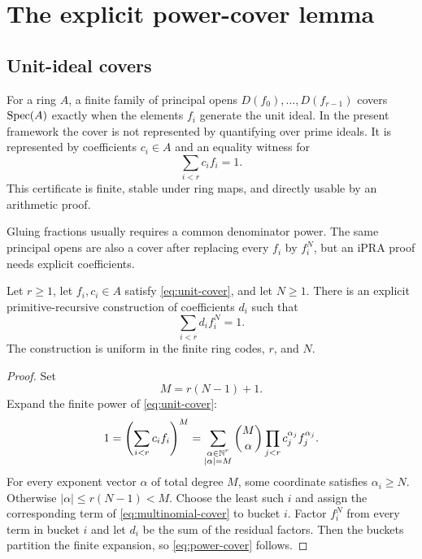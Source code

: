 \section{The explicit power-cover lemma}

\subsection{Unit-ideal covers}

For a ring $A$, a finite family of principal opens $D(f_0),\ldots,D(f_{r-1})$ covers
$\operatorname{Spec}(A)$ exactly when the elements $f_i$ generate the unit ideal.  In the present framework the
cover is not represented by quantifying over prime ideals.  It is represented by coefficients
$c_i\in A$ and an equality witness for
\begin{equation}\label{eq:unit-cover}
                 \sum_{i<r} c_i f_i=1.
\end{equation}
This certificate is finite, stable under ring maps, and directly usable by an arithmetic proof.

Gluing fractions usually requires a common denominator power.  The same principal opens are also a
cover after replacing every $f_i$ by $f_i^N$, but an iPRA proof needs explicit coefficients.

\begin{theorem}\label{thm:power-cover}
Let $r\geq1$, let $f_i,c_i\in A$ satisfy \eqref{eq:unit-cover}, and let $N\geq1$.  There is an
explicit primitive-recursive construction of coefficients $d_i$ such that
\begin{equation}\label{eq:power-cover}
                  \sum_{i<r}d_i f_i^N=1.
\end{equation}
The construction is uniform in the finite ring codes, $r$, and $N$.
\end{theorem}

\begin{proof}
Set
\[
                    M=r(N-1)+1.
\]
Expand the finite power of \eqref{eq:unit-cover}:
\begin{equation}\label{eq:multinomial-cover}
  1=\left(\sum_{i<r}c_i f_i\right)^M
   =\sum_{\substack{\alpha\in\mathbb N^r\\ |\alpha|=M}}
      \binom{M}{\alpha}\prod_{j<r}c_j^{\alpha_j}f_j^{\alpha_j}.
\end{equation}
For every exponent vector $\alpha$ of total degree $M$, some coordinate satisfies
$\alpha_i\geq N$.  Otherwise
$|\alpha|\leq r(N-1)<M$.  Choose the least such $i$ and assign the corresponding term of
\eqref{eq:multinomial-cover} to bucket $i$.  Factor $f_i^N$ from every term in bucket $i$ and let
$d_i$ be the sum of the residual factors.  Then the buckets partition the finite expansion, so
\eqref{eq:power-cover} follows.
\end{proof}

